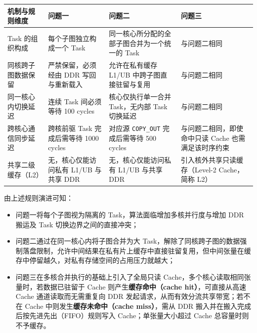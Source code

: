 \documentclass[anonymous,notoc]{gmcm2026}
\providecommand{\tightlist}{\setlength{\itemsep}{0pt}\setlength{\parskip}{0pt}}
\begin{document}
{\def\LTcaptype{table} %
\begin{table}[!htbp]\centering\small
\begin{tabular}{@{}
  >{\raggedright\arraybackslash}p{}
  >{\raggedright\arraybackslash}p{}
  >{\raggedright\arraybackslash}p{}
  >{\raggedright\arraybackslash}p{}@{}}
\toprule\noalign{}
\begin{minipage}[b]{\linewidth}\raggedright
机制与规则维度
\end{minipage} & \begin{minipage}[b]{\linewidth}\raggedright
问题一
\end{minipage} & \begin{minipage}[b]{\linewidth}\raggedright
问题二
\end{minipage} & \begin{minipage}[b]{\linewidth}\raggedright
问题三
\end{minipage} \\
\midrule\noalign{}


Task 的组织构成 & 每个子图独立构成一个 Task & 同一核心所分配的全部子图合并为一个统一的 Task & 与问题二相同 \\
同核跨子图数据保留 & 严禁保留，必须经由 DDR 写回与重新载入 & 允许在私有缓存 L1/UB 中跨子图直接驻留与复用 & 与问题二相同 \\
同一核心内切换延迟 & 连续 Task 间必须等待 100 cycles & 核心仅执行单一合并 Task，无内部 Task 切换延迟 & 与问题二相同 \\
跨核心通信同步延迟 & 跨核前驱 Task 完成后需等待 1000 cycles & 对应源 \texttt{COPY\_OUT} 完成后需等待 500 cycles & 与问题二相同，即使命中只读 Cache 也需满足该时序约束 \\
共享二级缓存（L2） & 无，核心仅能访问私有 L1/UB 与共享 DDR & 无，核心仅能访问私有 L1/UB 与共享 DDR & 引入核外共享只读缓存（Level-2 Cache，简称 L2） \\
\bottomrule\end{tabular}
\end{table}
}

由上述规则演进可知：

\begin{itemize}
\tightlist
\item
  问题一将每个子图视为隔离的 Task，算法面临增加多核并行度与增加 DDR 搬运及 Task 切换边界之间的直接冲突；
\item
  问题二通过在同一核心内将子图合并为大 Task，解除了同核跨子图的数据强制落盘限制，允许中间结果在私有片上缓存中直接驻留复用，但中间张量在缓存中停留越久，对私有存储空间的占用压力就越大；
\item
  问题三在多核合并执行的基础上引入了全局只读 Cache，多个核心读取相同张量时，若数据已驻留于 Cache 则产生\textbf{缓存命中（cache hit）}，可直接从高速 Cache 通道读取而无需重复向 DDR 发起请求，从而有效分流共享带宽；若不在 Cache 中则发生\textbf{缓存未命中（cache miss）}，需从 DDR 搬入并在搬入完成后按先进先出（FIFO）规则写入 Cache；单张量大小超过 Cache 总容量时则不予缓存。
\end{itemize}
\end{document}
